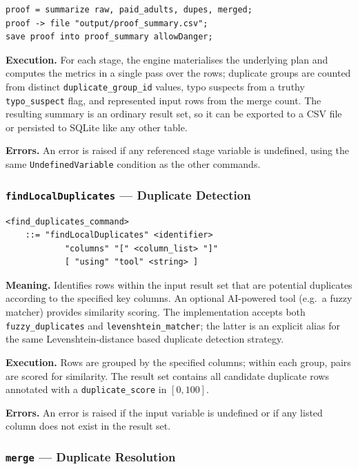 \begin{itemize}[label=-, noitemsep]
\begin{itemize}[label=-, noitemsep]
\begin{itemize}[label=-, noitemsep]
\begin{lstlisting}[style=dsl]
proof = summarize raw, paid_adults, dupes, merged;
proof -> file "output/proof_summary.csv";
save proof into proof_summary allowDanger;
\end{lstlisting}

\textbf{Execution.} For each stage, the engine materialises the underlying plan
and computes the metrics in a single pass over the rows; duplicate groups are
counted from distinct \texttt{duplicate\_group\_id} values, typo suspects from a
truthy \texttt{typo\_suspect} flag, and represented input rows from the merge
count. The resulting summary is an ordinary result set, so it can be exported to
a CSV file or persisted to SQLite like any other table.

\textbf{Errors.} An error is raised if any referenced stage variable is
undefined, using the same \texttt{UndefinedVariable} condition as the other
commands.

\subsubsection{\texttt{findLocalDuplicates} --- Duplicate Detection}

\begin{lstlisting}[style=bnf]
<find_duplicates_command>
    ::= "findLocalDuplicates" <identifier>
            "columns" "[" <column_list> "]"
            [ "using" "tool" <string> ]
\end{lstlisting}

\textbf{Meaning.} Identifies rows within the input result set that are
potential duplicates according to the specified key columns. An optional
AI-powered tool (e.g.\ a fuzzy matcher) provides similarity scoring. The
implementation accepts both \texttt{fuzzy\_duplicates} and
\texttt{levenshtein\_matcher}; the latter is an explicit alias for the same
Levenshtein-distance based duplicate detection strategy.

\textbf{Execution.} Rows are grouped by the specified columns; within each
group, pairs are scored for similarity. The result set contains all candidate
duplicate rows annotated with a \texttt{duplicate\_score} in $[0, 100]$.

\textbf{Errors.} An error is raised if the input variable is undefined or if
any listed column does not exist in the result set.

\subsubsection{\texttt{merge} --- Duplicate Resolution}


\end{itemize}
\end{itemize}
\end{itemize}
